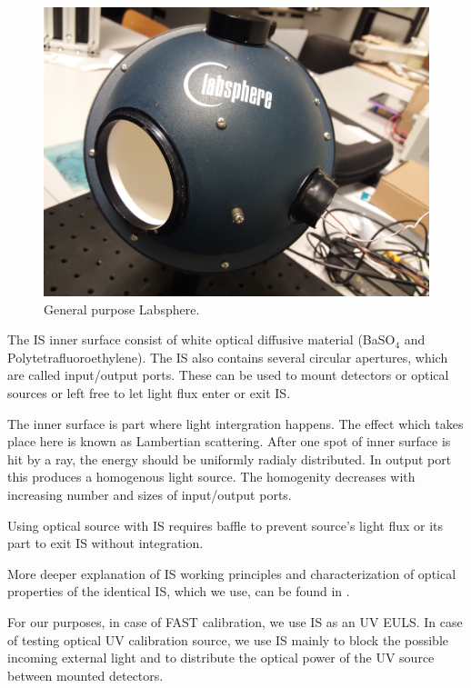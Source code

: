 \begin{figure}[H]
 \centering
 \includegraphics[scale=0.09, angle = 180]{./pictures/IntegrationSphere}
 \caption{General purpose Labsphere.}
 \label{Labsphere}
 
\end{figure}
\par
The IS inner surface consist of white optical diffusive material (BaSO$_4$ and Polytetrafluoroethylene). The IS also contains several circular apertures, which are called input/output ports. These can be used to mount detectors or optical sources or left free to let light flux enter or exit IS. 
\par
The inner surface is part where light intergration happens. The effect which takes place here is known as Lambertian scattering. After one spot of inner surface is hit by a ray, the energy should be uniformly radialy distributed. In output port this produces a homogenous light source. The homogenity decreases with increasing number and sizes of input/output ports.
\par
Using optical source with IS requires baffle to prevent source's light flux or its part to exit IS without integration.
\par
More deeper explanation of IS working principles and characterization of optical properties of the identical IS, which we use, can be found in \cite{VACULA2021167169}.
\par
For our purposes, in case of FAST calibration, we use IS as an UV EULS. In case of testing optical UV calibration source, we use IS mainly to block the possible incoming external light and to distribute the optical power of the UV source between mounted detectors.

